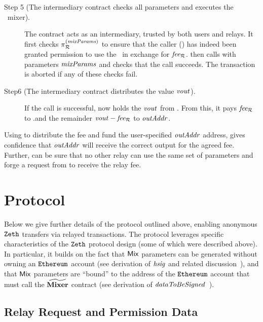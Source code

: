\begin{description}
  \item[Step 5 (The intermediary contract checks all parameters and executes the \zeth~mixer).] The \relayexec{} contract acts as an intermediary, trusted by both users and relays. It first checks $\pi^{(\mathit{mixParams})}_{\mathcal{R}}$ to ensure that the caller (\relayEthAccount{}) has indeed been granted permission to use the \mixparams~in exchange for $\mathit{fee_{\mathcal{R}}}$. \relayexec{} then calls \mixer{} with parameters $\mathit{mixParams}$ and checks that the call succeeds. The transaction is aborted if any of these checks fail.

  \item[Step6 (The intermediary contract distributes the value $\mathit{vout}$).] If the \mix{} call is successful, \relayexec{} now holds the $\mathit{vout}$ from \mixer{}. From this, it pays $\mathit{fee_{\mathcal{R}}}$ to \relayEthAccount{}.\addr and the remainder $\mathit{vout} - \mathit{fee_{\mathcal{R}}}$ to $\mathit{outAddr}$.
\end{description}

\begin{remark}
  Using \relayexec{} to distribute the fee and fund the user-specified $\mathit{outAddr}$ address, gives \userZethAccount{} confidence that $\mathit{outAddr}$ will receive the correct output for the agreed fee. Further, \relayEthAccount{} can be sure that no other relay can use the same set of \mix{} parameters and forge a request from \userZethAccount{} to receive the relay fee.
\end{remark}

\section{Protocol}\label{relay-proof-permission:protocol}

Below we give further details of the protocol outlined above, enabling anonymous $\texttt{Zeth}$ transfers via relayed transactions. The protocol leverages specific characteristics of the $\texttt{Zeth}$ protocol design (some of which were described above). In particular, it builds on the fact that $\mathsf{Mix}$ parameters can be generated without owning an $\texttt{Ethereum}$ account (see derivation of $\mathit{hsig}$ and related discussion~\cite[Remark A.2.2]{zeth-protocol}), and that $\mathsf{Mix}$ parameters are ``bound'' to the address of the $\texttt{Ethereum}$ account that must call the $\widetilde{\mathbf{Mixer}}$ contract (see derivation of $\mathit{dataToBeSigned}$~\cite[Section 2.3]{zeth-protocol}).

\subsection{Relay Request and Permission Data}

